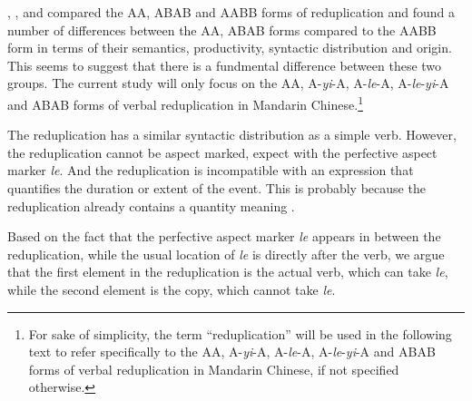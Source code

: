 \documentclass[
a4paper,
10pt,
oneside,
]{scrartcl}
\begin{document}
\citet{Arcodiaetal2014}, \citet{Fan1964}, \citet{MelloniBasciano2018} and \citet{Xie2020} compared the AA, ABAB and AABB forms of reduplication and found a number of differences between the AA, ABAB forms compared to the AABB form in terms of their semantics, productivity, syntactic distribution and origin. This seems to suggest that there is a fundmental difference between these two groups. The current study will only focus on the AA, A-\emph{yi}-A, A-\emph{le}-A, A-\emph{le}-\emph{yi}-A and ABAB forms of verbal reduplication in Mandarin Chinese.\footnote{For sake of simplicity, the term “reduplication” will be used in the following text to refer specifically to the AA, A-\emph{yi}-A, A-\emph{le}-A, A-\emph{le}-\emph{yi}-A and ABAB forms of verbal reduplication in Mandarin Chinese, if not specified otherwise.}

The reduplication has a similar syntactic distribution as a simple verb. However, the reduplication cannot be aspect marked, expect with the perfective aspect marker \emph{le}. And the reduplication is incompatible with an expression that quantifies the duration or extent of the event. This is probably because the reduplication already contains a quantity meaning \citep{Li1998}.


Based on the fact that the perfective aspect marker \emph{le} appears in between the reduplication, while the usual location of \emph{le} is directly after the verb, we argue that the first element in the reduplication is the actual verb, which can take \emph{le}, while the second element is the copy, which cannot take \emph{le}.
\end{document}
